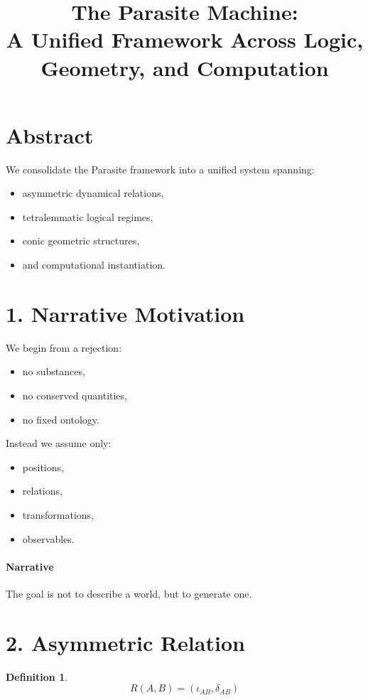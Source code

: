 \documentclass[11pt]{article}
\title{The Parasite Machine:\\
A Unified Framework Across Logic, Geometry, and Computation}
\author{}
\date{}
\newtheorem{definition}{Definition}
\begin{document}
\maketitle

\section*{Abstract}
We consolidate the Parasite framework into a unified system spanning:
\begin{itemize}
\item asymmetric dynamical relations,
\item tetralemmatic logical regimes,
\item conic geometric structures,
\item and computational instantiation.
\end{itemize}

\section{1. Narrative Motivation}
We begin from a rejection:
\begin{itemize}
\item no substances,
\item no conserved quantities,
\item no fixed ontology.
\end{itemize}

Instead we assume only:
\begin{itemize}
\item positions,
\item relations,
\item transformations,
\item observables.
\end{itemize}

\paragraph{Narrative}
The goal is not to describe a world, but to generate one.

\section{2. Asymmetric Relation}

\begin{definition}
\[
R(A,B) = (\iota_{AB}, \delta_{AB})
\]
\end{definition}
\end{document}
